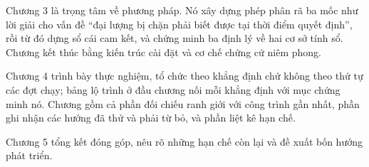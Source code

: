 Chương 3 là trọng tâm về phương pháp. Nó xây dựng phép phân rã ba mốc như lời giải cho vấn đề
``đại lượng bị chặn phải biết được tại thời điểm quyết định'', rồi từ đó dựng sổ cái cam kết,
và chứng minh ba định lý về hai cơ sở tính sổ. Chương kết thúc bằng kiến trúc cài đặt và cơ chế
chứng cứ niêm phong.

Chương 4 trình bày thực nghiệm, tổ chức theo khẳng định chứ không theo thứ tự các đợt chạy;
bảng lộ trình ở đầu chương nối mỗi khẳng định với mục chứng minh nó. Chương gồm cả phần đối
chiếu ranh giới với công trình gần nhất, phần ghi nhận các hướng đã thử và phải từ bỏ, và phần
liệt kê hạn chế.

Chương 5 tổng kết đóng góp, nêu rõ những hạn chế còn lại và đề xuất bốn hướng phát triển.
